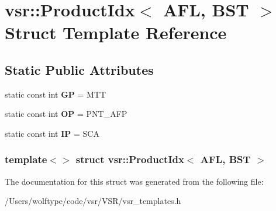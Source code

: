 \hypertarget{structvsr_1_1_product_idx_3_01_a_f_l_00_01_b_s_t_01_4}{\section{vsr\-:\-:Product\-Idx$<$ A\-F\-L, B\-S\-T $>$ Struct Template Reference}
\label{structvsr_1_1_product_idx_3_01_a_f_l_00_01_b_s_t_01_4}
}
\subsection*{Static Public Attributes}
\begin{DoxyCompactItemize}
\item 
\hypertarget{structvsr_1_1_product_idx_3_01_a_f_l_00_01_b_s_t_01_4_ab85983f545a0a1859f2003dcf4523156}{static const int {\bfseries G\-P} = M\-T\-T}\label{structvsr_1_1_product_idx_3_01_a_f_l_00_01_b_s_t_01_4_ab85983f545a0a1859f2003dcf4523156}

\item 
\hypertarget{structvsr_1_1_product_idx_3_01_a_f_l_00_01_b_s_t_01_4_a808f82b347d6554c02a3b9cdc622a5ed}{static const int {\bfseries O\-P} = P\-N\-T\-\_\-\-A\-F\-P}\label{structvsr_1_1_product_idx_3_01_a_f_l_00_01_b_s_t_01_4_a808f82b347d6554c02a3b9cdc622a5ed}

\item 
\hypertarget{structvsr_1_1_product_idx_3_01_a_f_l_00_01_b_s_t_01_4_ab09d558db689bc77201030095dae2ff6}{static const int {\bfseries I\-P} = S\-C\-A}\label{structvsr_1_1_product_idx_3_01_a_f_l_00_01_b_s_t_01_4_ab09d558db689bc77201030095dae2ff6}

\end{DoxyCompactItemize}
\subsubsection*{template$<$$>$ struct vsr\-::\-Product\-Idx$<$ A\-F\-L, B\-S\-T $>$}



The documentation for this struct was generated from the following file\-:\begin{DoxyCompactItemize}
\item 
/\-Users/wolftype/code/vsr/\-V\-S\-R/vsr\-\_\-templates.\-h\end{DoxyCompactItemize}
